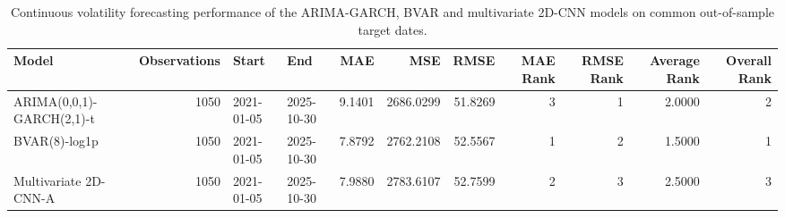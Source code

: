 \begin{table}
\caption{Continuous volatility forecasting performance of the ARIMA-GARCH, BVAR and multivariate 2D-CNN models on common out-of-sample target dates.}
\label{tab:continuous_volatility_comparison}
\begin{tabular}{lrllrrrrrrr}
\toprule
Model & Observations & Start & End & MAE & MSE & RMSE & MAE Rank & RMSE Rank & Average Rank & Overall Rank \\
\midrule
ARIMA(0,0,1)-GARCH(2,1)-t & 1050 & 2021-01-05 & 2025-10-30 & 9.1401 & 2686.0299 & 51.8269 & 3 & 1 & 2.0000 & 2 \\
BVAR(8)-log1p & 1050 & 2021-01-05 & 2025-10-30 & 7.8792 & 2762.2108 & 52.5567 & 1 & 2 & 1.5000 & 1 \\
Multivariate 2D-CNN-A & 1050 & 2021-01-05 & 2025-10-30 & 7.9880 & 2783.6107 & 52.7599 & 2 & 3 & 2.5000 & 3 \\
\bottomrule
\end{tabular}
\end{table}
